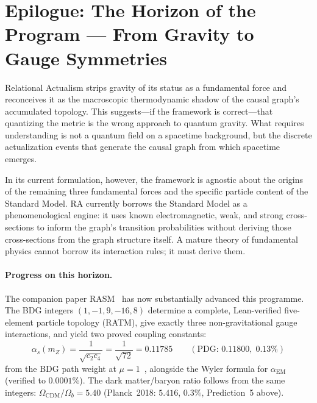 \documentclass[11pt,a4paper]{article}
\theoremstyle{plain}
\theoremstyle{definition}
\theoremstyle{remark}
\begin{document}

\section*{Epilogue: The Horizon of the Program --- From Gravity to Gauge Symmetries}
\label{sec:epilogue}

Relational Actualism strips gravity of its status as a fundamental force and
reconceives it as the macroscopic thermodynamic shadow of the causal graph's
accumulated topology. This suggests---if the framework is correct---that
quantizing the metric is the wrong approach to quantum gravity. What requires
understanding is not a quantum field on a spacetime background, but the discrete
actualization events that generate the causal graph from which spacetime emerges.

In its current formulation, however, the framework is agnostic about the origins
of the remaining three fundamental forces and the specific particle content of the
Standard Model. RA currently borrows the Standard Model as a phenomenological
engine: it uses known electromagnetic, weak, and strong cross-sections to inform
the graph's transition probabilities without deriving those cross-sections from
the graph structure itself. A mature theory of fundamental physics cannot borrow
its interaction rules; it must derive them.

\paragraph{Progress on this horizon.}
The companion paper RASM~\citep{Sandeman2026RASM} has now substantially
advanced this programme.  The BDG integers $(1,-1,9,-16,8)$ determine a
complete, Lean-verified five-element particle topology (RATM), give exactly
three non-gravitational gauge interactions, and yield two proved coupling
constants:
\begin{equation}
  \alpha_s(m_Z) = \frac{1}{\sqrt{c_2 c_4}} = \frac{1}{\sqrt{72}} = 0.11785
  \qquad (\text{PDG: } 0.11800,\; 0.13\%)
\end{equation}
from the BDG path weight at $\mu=1$~\citep{Sandeman2026BDG}, alongside the
Wyler formula for $\alpha_{\mathrm{EM}}$ (verified to $0.0001\%$).  The
dark matter/baryon ratio follows from the same integers:
$\Omega_{\mathrm{CDM}}/\Omega_b = 5.40$ (Planck~2018: $5.416$, $0.3\%$,
Prediction~5 above).
\end{document}
